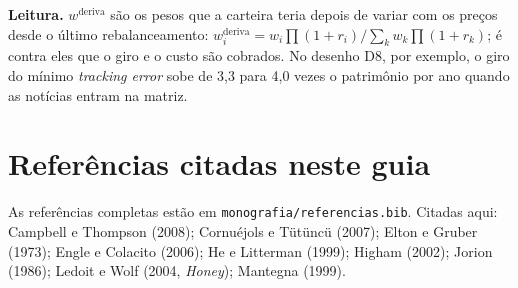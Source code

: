 \documentclass[11pt,a4paper]{article}
\newcommand{\leitura}[1]{\par\textbf{Leitura.} #1}
\begin{document}
\leitura{$w^{\mathrm{deriva}}$ são os pesos que a carteira teria depois de variar com os preços desde o
último rebalanceamento: $w_i^{\mathrm{deriva}}=w_i\prod(1+r_{i})/\sum_k w_k\prod(1+r_k)$; é contra eles que
o giro e o custo são cobrados. No desenho D8, por exemplo, o giro do mínimo \emph{tracking error} sobe de
3,3 para 4,0 vezes o patrimônio por ano quando as notícias entram na matriz.}

\section*{Referências citadas neste guia}
\small
As referências completas estão em \texttt{monografia/referencias.bib}. Citadas aqui: Campbell e Thompson
(2008); Cornuéjols e Tütüncü (2007); Elton e Gruber (1973); Engle e Colacito (2006); He e Litterman (1999);
Higham (2002); Jorion (1986); Ledoit e Wolf (2004, \emph{Honey}); Mantegna (1999).
\end{document}
